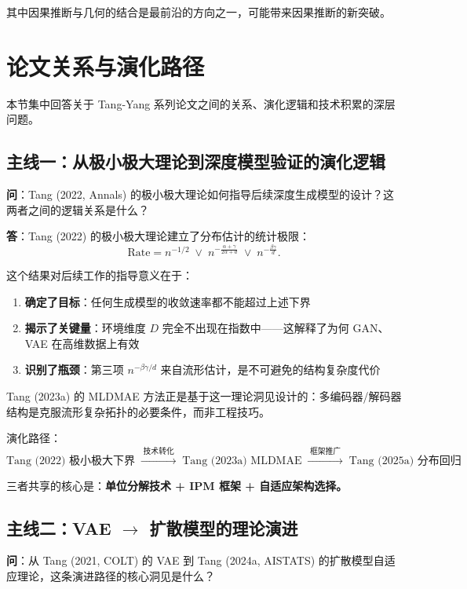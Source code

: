其中因果推断与几何的结合是最前沿的方向之一，可能带来因果推断的新突破。

\section{论文关系与演化路径}

本节集中回答关于 Tang-Yang 系列论文之间的关系、演化逻辑和技术积累的深层问题。

\subsection{主线一：从极小极大理论到深度模型验证的演化逻辑}\label{sec:qa-evolution-line1}

\textbf{问}：Tang (2022, Annals) 的极小极大理论如何指导后续深度生成模型的设计？这两者之间的逻辑关系是什么？

\textbf{答}：Tang (2022) 的极小极大理论建立了分布估计的统计极限：
\[
\text{Rate} = n^{-1/2} \;\vee\; n^{-\frac{\alpha+\gamma}{2\alpha+d}} \;\vee\; n^{-\frac{\beta\gamma}{d}}.
\]

这个结果对后续工作的指导意义在于：
\begin{enumerate}
    \item \textbf{确定了目标}：任何生成模型的收敛速率都不能超过上述下界
    \item \textbf{揭示了关键量}：环境维度 $D$ 完全不出现在指数中——这解释了为何 GAN、VAE 在高维数据上有效
    \item \textbf{识别了瓶颈}：第三项 $n^{-\beta\gamma/d}$ 来自流形估计，是不可避免的结构复杂度代价
\end{enumerate}

Tang (2023a) 的 MLDMAE 方法正是基于这一理论洞见设计的：多编码器/解码器结构是克服流形复杂拓扑的必要条件，而非工程技巧。

演化路径：
\[
\text{Tang (2022) 极小极大下界}
\;\xrightarrow{\;\text{技术转化}\;}\;
\text{Tang (2023a) MLDMAE}
\;\xrightarrow{\;\text{框架推广}\;}\;
\text{Tang (2025a) 分布回归}
\]

三者共享的核心是：\textbf{单位分解技术 + IPM 框架 + 自适应架构选择。}

\subsection{主线二：VAE $\rightarrow$ 扩散模型的理论演进}\label{sec:qa-evolution-line2}

\textbf{问}：从 Tang (2021, COLT) 的 VAE 到 Tang (2024a, AISTATS) 的扩散模型自适应理论，这条演进路径的核心洞见是什么？

